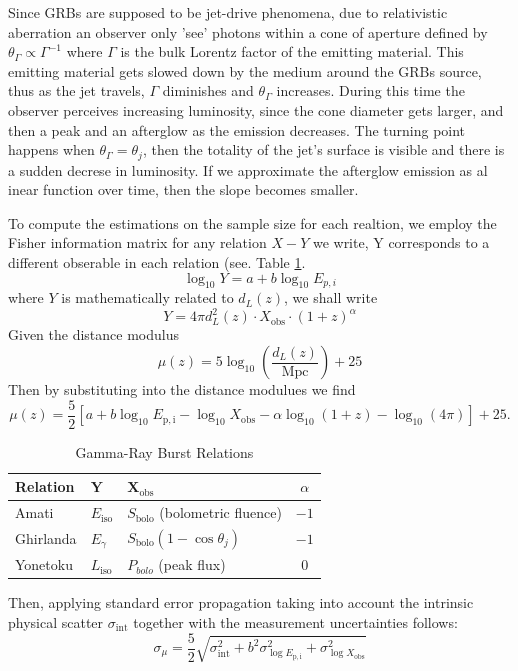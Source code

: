 \documentclass[
    aps,
    prd,
    twocolumn,
    nofootinbib,
    floatfix,
    superscriptaddress,
]{revtex4-2}
\begin{document}
Since GRBs are supposed to be jet-drive phenomena, due to relativistic aberration an observer only 'see' photons within a cone of aperture defined by $\theta_\Gamma \propto \Gamma^{-1}$ where $\Gamma$ is the bulk Lorentz factor of the emitting material. This emitting material gets slowed down by the medium around the GRBs source, thus as the jet travels, $\Gamma$ diminishes and $\theta_\Gamma$ increases. During this time the observer perceives increasing luminosity, since the cone diameter gets larger, and then a peak and an afterglow as the emission decreases. The turning point happens when $\theta_\Gamma = \theta_j$, then the totality of the jet's surface is visible and there is a sudden decrese in luminosity. If we approximate the afterglow emission as al inear function over time, then the slope becomes smaller.

To compute the estimations on the sample size for each realtion, we employ the Fisher information matrix for any relation $X-Y$ we write, Y corresponds to a different obserable in each relation (see. Table \ref{tab:grb}.
$$
\log_{10} Y = a + b \log_{10} E_{p,i}
$$
where $Y$ is mathematically related to $d_L(z)$, we shall write
$$
Y = 4\pi d_L^2(z) \cdot X_\mathrm{obs} \cdot (1+z)^\alpha
$$
Given the distance modulus
$$
\mu(z) = 5 \log_{10} \left(\frac{d_L (z)}{\mathrm{Mpc}}\right) +25
$$
Then by substituting into the distance modulues we find
$$
\mu(z) = \frac{5}{2} \left[a + b\log_{10} E_\mathrm{p,i} - \log_{10} X_\mathrm{obs} - \alpha \log_{10} (1+z) - \log_{10}(4\pi) \right] + 25.
$$


\begin{table}[htbp]
	\centering
	\caption{Gamma-Ray Burst Relations}
	\label{tab:grb}
	\small

	\begin{tabular}{l l l c}
		\hline
		\textbf{Relation} & $\mathbf{Y}$ & $\mathbf{X_\mathrm{obs}}$ & \textbf{$\alpha$} \\
		\hline
		Amati & $E_{\mathrm{iso}}$ & $S_\mathrm{bolo}$ (bolometric fluence) & $-1$ \\
		\hline
		Ghirlanda & $E_{\gamma}$ & $S_\mathrm{bolo} (1-\cos\theta_j)$ & $-1$ \\
		\hline
		Yonetoku & $L_{\mathrm{iso}}$ & $P_{bolo}$ (peak flux) & $0$ \\
		\hline
	\end{tabular}
\end{table}

Then, applying standard error propagation taking into account the intrinsic physical scatter $\sigma_\mathrm{int}$ together with the measurement uncertainties follows:
$$
\sigma_\mu = \frac{5}{2} \sqrt{\sigma_\mathrm{int}^2 + b^2 \sigma_{\log E_\mathrm{p,i}}^2 + \sigma_{\log X_\mathrm{obs}}^2}
$$
\end{document}
